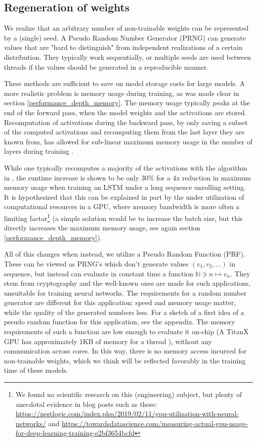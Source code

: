 \documentclass[]{article}
\begin{document}
\begin{multicols}{2}
	\section{Regeneration of weights}
	We realize that an arbitrary number of non-trainable weights can be represented by a (single) seed. A Pseudo Random Number Generator (PRNG) can generate values that are "hard to distinguish" from independent realizations of a certain distribution. They typically work sequentially, or multiple seeds are used between threads if the values should be generated in a reproducible manner.
	
	These methods are sufficient to save on model storage costs for large models. A more realistic problem is memory usage during training, as was made clear in section \ref{performance_depth_memory}. The memory usage typically peaks at the end of the forward pass, when the model weights and the activations are stored. Recomputation of activations during the backward pass, by only saving a subset of the computed activations and recomputing them from the last layer they are known from, has allowed for sub-linear maximum memory usage in the number of layers during training \cite{chen2016training}.
	
	While one typically recomputes a majority of the activations with the algorithm in \cite{chen2016training}, the runtime increase is shown to be only 30\% for a 4x reduction in maximum memory usage when training an LSTM under a long sequence unrolling setting. It is hypothesized that this can be explained in part by the under utilization of computational resources in a GPU, where memory bandwidth is more often a limiting factor\footnote{We found no scientific research on this (engineering) subject, but plenty of anecdotal evidence in blog posts such as these: \url{https://nestlogic.com/index.php/2019/02/11/gpu-utilization-with-neural-networks/} and  \url{https://towardsdatascience.com/measuring-actual-gpu-usage-for-deep-learning-training-e2bf3654bcfd}} (a simple solution would be to increase the batch size, but this directly increases the maximum memory usage, see again section \ref{performance_depth_memory}).
	
	All of this changes when instead, we utilize a Pseudo Random Function (PRF). These can be viewed as PRNG's which don't generate values $(v_1, v_2, \ldots)$ in sequence, but instead can evaluate in constant time a function $\mathds{N} \ni n \mapsto v_n$. They stem from cryptography and the well-known ones are made for such applications, unsuitable for training neural networks. The requirements for a random number generator are different for this application: speed and memory usage matter, while the quality of the generated numbers less. For a sketch of a first idea of a pseudo random function for this application, see the appendix. The memory requirements of such a function are low enough to evaluate it on-chip (A TitanX GPU has approximately 1KB of memory for a thread \cite{DBLP:conf/icml/DiamosSCCCEEHS16}), without any communication across cores. In this way, there is no memory access incurred for non-trainable weights, which we think will be reflected favorably in the training time of these models.
	

\end{multicols}
\end{document}
